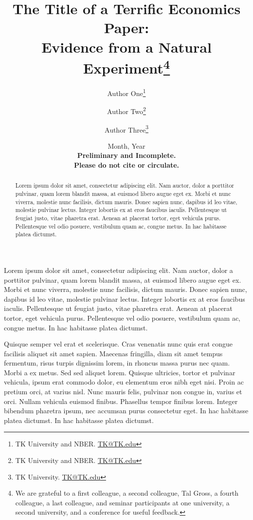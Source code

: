 \documentclass[12pt]{article}
\title{ \vspace*{-2.5cm} \hspace*{-0.5cm}The Title of a Terrific Economics Paper: \\ Evidence from a Natural Experiment\footnote{
We are grateful to 
a first colleague,
a second colleague, 
Tal Gross, %
a fourth colleague, 
a last colleague,
and seminar participants at 
one university, 
a second university, 
and a conference
for useful feedback. 
}}
\author{Author One\thanks{TK University and NBER.
\href{mailto:TK@TK.edu}{TK@TK.edu}} \and Author Two\thanks{TK University and
NBER.  \href{mailto:TK@TK.edu}{TK@TK.edu}} \and Author Three\thanks{TK
University. \href{mailto:TK@TK.edu}{TK@TK.edu}}}
\date{ \vspace*{0.5cm} Month, Year\\
\textbf{Preliminary and Incomplete. \\ Please do not cite or circulate.}
}
\begin{document}
\bgroup
\let\footnoterule\relax

\begin{singlespace}
\maketitle


\begin{abstract}
    \noindent Lorem ipsum dolor sit amet, consectetur adipiscing elit. Nam auctor, dolor a porttitor pulvinar, quam lorem blandit massa, at euismod libero augue eget ex. Morbi et nunc viverra, molestie nunc facilisis, dictum mauris. Donec sapien nunc, dapibus id leo vitae, molestie pulvinar lectus. Integer lobortis ex at eros faucibus iaculis. Pellentesque ut feugiat justo, vitae pharetra erat. Aenean at placerat tortor, eget vehicula purus. Pellentesque vel odio posuere, vestibulum quam ac, congue metus. In hac habitasse platea dictumst.
\end{abstract}
\end{singlespace}
\thispagestyle{empty}

\clearpage
\egroup
\setcounter{page}{1}



\noindent Lorem ipsum dolor sit amet, consectetur adipiscing elit. Nam auctor, dolor a porttitor pulvinar, quam lorem blandit massa, at euismod libero augue eget ex. Morbi et nunc viverra, molestie nunc facilisis, dictum mauris. Donec sapien nunc, dapibus id leo vitae, molestie pulvinar lectus. Integer lobortis ex at eros faucibus iaculis. Pellentesque ut feugiat justo, vitae pharetra erat. Aenean at placerat tortor, eget vehicula purus. Pellentesque vel odio posuere, vestibulum quam ac, congue metus. In hac habitasse platea dictumst.

Quisque semper vel erat et scelerisque. Cras venenatis nunc quis erat congue facilisis aliquet sit amet sapien. Maecenas fringilla, diam sit amet tempus fermentum, risus turpis dignissim lorem, in rhoncus massa purus nec quam. Morbi a ex metus. Sed sed aliquet lorem. Quisque ultricies, tortor et pulvinar vehicula, ipsum erat commodo dolor, eu elementum eros nibh eget nisi. Proin ac pretium orci, at varius nisl. Nunc mauris felis, pulvinar non congue in, varius et orci. Nullam vehicula euismod finibus. Phasellus tempor finibus lorem. Integer bibendum pharetra ipsum, nec accumsan purus consectetur eget. In hac habitasse platea dictumst. In hac habitasse platea dictumst.
\end{document}
